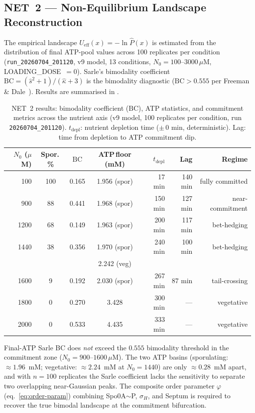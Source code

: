 \documentclass[11pt,a4paper]{article}
\newcommand{\BC}{\mathrm{BC}}
\begin{document}
\subsection{NET~2 --- Non-Equilibrium Landscape Reconstruction}
\label{ssec:t2}

The empirical landscape \(U_{\mathrm{eff}}(x) = -\ln \hat P(x)\) is estimated
from the distribution of final ATP-pool values across 100 replicates per
condition (\texttt{run\_20260704\_201120}, v9 model, 13 conditions,
$N_0 = 100$--$3000\,\mu$M, LOADING\_DOSE~$= 0$).
Sarle's bimodality coefficient
\(\BC = (\hat s^2 + 1) / (\hat\kappa + 3)\) is the bimodality
diagnostic (\(\BC > 0.555\) per Freeman \& Dale~\cite{Freeman2013}).
Results are summarised in .

\begin{table}[h]
\centering
\caption{NET~2 results: bimodality coefficient ($\BC$), ATP statistics,
and commitment metrics across the nutrient axis (v9 model,
100 replicates per condition, run \texttt{20260704\_201120}).
$t_{\mathrm{depl}}$: nutrient depletion time ($\pm\,0$ min, deterministic).
Lag: time from depletion to ATP commitment dip.}
\label{tab:t2}
{\small\begin{tabular}{rcccrrr}
\toprule
$N_0$ ($\mu$M) & Spor.\,\% & $\BC$ & ATP\,floor (mM) & $t_{\mathrm{depl}}$ & Lag & Regime \\
\midrule
100  & 100 & 0.165 & 1.956 (spor) & 17 min & 140 min & fully committed \\
900  &  88 & 0.441 & 1.968 (spor) & 150 min & 127 min & near-commitment \\
1200 &  68 & 0.149 & 1.963 (spor) & 200 min & 117 min & bet-hedging \\
1440 &  38 & 0.356 & 1.970 (spor) & 240 min & 100 min & bet-hedging \\
     &     &       & 2.242 (veg)  &         &         & \\
1600 &   9 & 0.192 & 2.030 (spor) & 267 min &  87 min & tail-crossing \\
1800 &   0 & 0.270 & 3.428        & 300 min &  --- & vegetative \\
2000 &   0 & 0.533 & 4.435        & 333 min &  --- & vegetative \\
\bottomrule
\end{tabular}}
\end{table}

Final-ATP Sarle BC does \emph{not} exceed the $0.555$ bimodality
threshold in the commitment zone ($N_0 = 900$--$1600\,\mu$M).
The two ATP basins (sporulating: $\approx 1.96$~mM; vegetative:
$\approx 2.24$~mM at $N_0 = 1440$) are only $\approx 0.28$~mM
apart, and with $n = 100$ replicates the Sarle coefficient lacks the
sensitivity to separate two overlapping near-Gaussian peaks.
The composite order parameter $\varphi$ (eq.~\ref{eq:order-param})
combining Spo0A$\sim$P, $\sigma_H$, and Septum is required to recover
the true bimodal landscape at the commitment bifurcation.
\end{document}
